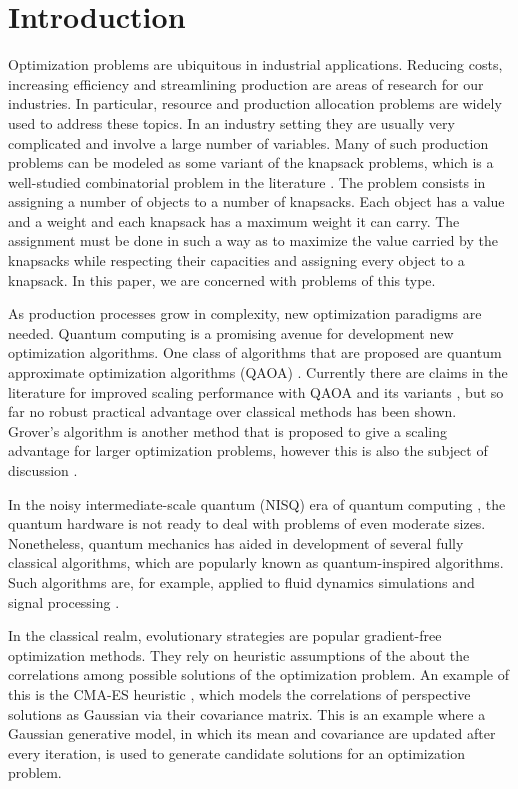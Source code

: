 \section{Introduction}
Optimization problems are ubiquitous in industrial applications. Reducing costs, increasing efficiency and streamlining production are areas of research for our industries. In particular, resource and production allocation problems are widely used to address these topics. In an industry setting they are usually very complicated  and involve a large number of variables. Many of such production problems can be modeled as some variant of the knapsack problems, which is a well-studied combinatorial problem in the literature \cite{10.5555/98124}. The problem consists in assigning a number of objects to a number of knapsacks. Each object has a value and a weight and each knapsack has a maximum weight it can carry. The assignment must be done in such a way as to maximize the value carried by the knapsacks while respecting their capacities and assigning every object to a knapsack. In this paper, we are concerned with problems of this type.

As production processes grow in complexity, new optimization paradigms are needed. Quantum computing is a promising avenue for development new optimization algorithms. One class of algorithms that are proposed are quantum approximate optimization algorithms (QAOA) \cite{farhi2014quantum}. Currently there are claims in the literature for improved scaling performance with QAOA  and its variants \cite{doi:10.1126/sciadv.adm6761}, \cite{montanaro2024quantumspeedupssolvingnearsymmetric} but so far no robust practical advantage over classical methods has been shown. 
Grover's algorithm \cite{Grover_1996} is another method that is proposed to give a scaling advantage for larger optimization problems, however this is also the subject of discussion \cite{PhysRevX.14.041029}.   

In the noisy intermediate-scale quantum (NISQ) era of quantum computing \cite{preskill2018}, the quantum hardware is not ready to deal with problems of even moderate sizes. Nonetheless, quantum mechanics has aided in development of several fully classical algorithms, which are popularly known as quantum-inspired algorithms. Such algorithms are, for example, applied to fluid dynamics simulations \cite{Gourianov2022} and signal processing \cite{PRXQuantum.4.040318}.

In the classical realm, evolutionary strategies are popular gradient-free optimization methods. They rely on heuristic assumptions of the about the correlations among possible solutions of the optimization problem. An example of this is the CMA-ES heuristic \cite{hansen2019pycma}, which models the correlations of perspective solutions as Gaussian via their covariance matrix. This is an example where a Gaussian generative model, in which its mean and covariance are updated after every iteration, is used to generate candidate solutions for an optimization problem. 

